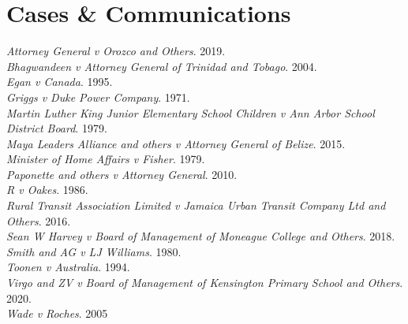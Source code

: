\documentclass[output=paper,colorlinks,citecolor=brown]{langscibook}
\begin{document}
\section*{Cases \& Communications}
   \emph{Attorney General v Orozco and Others}. 2019.  \\
   \emph{Bhagwandeen v Attorney General of Trinidad and Tobago}. 2004. \\
   \emph{Egan v Canada}. 1995. \\
   \emph{Griggs v Duke Power Company}. 1971. \\
   \emph{Martin Luther King Junior Elementary School Children v Ann Arbor School District Board}. 1979.  \\
   \emph{Maya Leaders Alliance and others v Attorney General of Belize}. 2015. \\
   \emph{Minister of Home Affairs v Fisher}. 1979. \\ 
   \emph{Paponette and others v Attorney General}. 2010. \\
   \emph{R v Oakes}. 1986. \\
   \emph{Rural Transit Association Limited v Jamaica Urban Transit Company Ltd and Others}. 2016. \\
   \emph{Sean W Harvey v Board of Management of Moneague College and Others}. 2018. \\
   \emph{Smith and AG v LJ Williams}. 1980. \\
   \emph{Toonen v Australia}. 1994. \\
   \emph{Virgo and ZV v Board of Management of Kensington Primary School and Others}. 2020. \\
   \emph{Wade v Roches}. 2005
\end{document}
